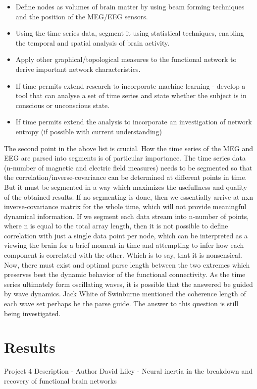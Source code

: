 \documentclass{article}
\begin{document}
\begin{itemize}
\item Define nodes as volumes of brain matter by using beam forming techniques and  the position of the MEG/EEG sensors.
\item Using the time series data, segment it using statistical techniques, enabling the  temporal and spatial analysis of brain activity.
\item Apply other graphical/topological measures to the functional network to derive  important network characteristics.
\item If time permits extend research to incorporate machine learning - develop a tool  that can analyse a set of time series and state whether the subject is in conscious or unconscious state.
\item If time permits extend the analysis to incorporate an investigation of network  entropy (if possible with current understanding)
\end{itemize}
The second point in the above list is crucial. How the time series of the MEG and EEG are  parsed into segments is of particular importance. The time series data (n-number of magnetic and electric field measures) needs to be segmented so that the correlation/inverse-covariance can be determined at different points in time. But it must be segmented in a way which maximizes the usefullness and quality of the obtained results. If no segmenting is done, then we essentially arrive at nxn inverse-covariance matrix for the  whole time, which will not provide meaningful dynamical information. If we segment each data stream into n-number of points, where n is equal to the total array length, then it is not possible to define correlation with just a single data point per node, which can be interpreted as a viewing  the brain for a brief moment in time and attempting to infer how each component is correlated with the other. Which is to say, that it is nonsensical. Now, there must exist and optimal parse length between the two extremes which preserves best the dynamic behavior of the functional  connectivity. As the time series ultimately form oscillating waves, it is possible that the answered be guided by wave dynamics. Jack White of Swinburne mentioned the coherence length of each wave set perhaps be the parse guide. The answer to this question is still being investigated.
\section{Results}
Project 4 Description - Author David Liley - Neural inertia in the breakdown and recovery of functional brain networks
\\
\\
\end{document}
